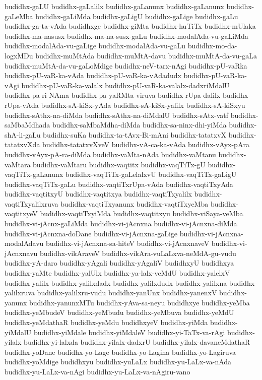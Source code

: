 {budidhx-gaLU
budidhx-gaLalilx
budidhx-gaLanunx
budidhx-gaLanunx
budidhx-gaLeMba
budidhx-gaLiMda
budidhx-gaLigU
budidhx-gaLige
budidhx-gaLu
budidhx-ga-ta-vAda
budidhxge
budidhx-giMta
budidhx-huTiTx
budidhx-mUlaka
budidhx-ma-nasusx
budidhx-ma-na-susx-gaLu
budidhx-modalAda-vu-gaLiMda
budidhx-modalAda-vu-gaLige
budidhx-modalAda-vu-gaLu
budidhx-mo-da-logxMDu
budidhx-muMtAda
budidhx-muMtA-davu
budidhx-muMtA-da-vu-gaLa
budidhx-muMtA-da-vu-gaLoMdige
budidhx-neV-tarx-nAgi
budidhx-pU-vaRka
budidhx-pU-vaR-ka-vAda
budidhx-pU-vaR-ka-vAdadudx
budidhx-pU-vaR-ka-vAgi
budidhx-pU-vaR-ka-valalx
budidhx-pU-vaR-ka-valalx-dadxriMdalU
budidhx-pa-ri-NAma
budidhx-pa-yaRMta-viruva
budidhx-rUpa-dalilx
budidhx-rUpa-vAda
budidhx-sA-kiSx-yAda
budidhx-sA-kiSx-yalilx
budidhx-sA-kiSxyu
budidhx-sAthx-na-diMda
budidhx-sAthx-na-diMdalU
budidhx-sAtx-vatf
budidhx-saMbaMdhada
budidhx-saMbaMdha-diMda
budidhx-sa-ninx-dhi-yiMda
budidhx-shA-li-gaLu
budidhx-suKa
budidhx-ta-tAvx-Bi-mAni
budidhx-tatatxvX
budidhx-tatatxvXda
budidhx-tatatxvXveV
budidhx-vA-ca-ka-vAda
budidhx-vAyx-pAra
budidhx-vAyx-pA-ra-diMda
budidhx-vaMta-nAda
budidhx-vaMtanu
budidhx-vaMtara
budidhx-vaMtaru
budidhx-vaqtitx
budidhx-vaqTiTx-gU
budidhx-vaqTiTx-gaLanunx
budidhx-vaqTiTx-gaLelalxvU
budidhx-vaqTiTx-gaLigU
budidhx-vaqTiTx-gaLu
budidhx-vaqtiTxrUpa-vAda
budidhx-vaqtiTxyAda
budidhx-vaqtitxyU
budidhx-vaqtitxya
budidhx-vaqtiTxyalilx
budidhx-vaqtiTxyalilxruva
budidhx-vaqtiTxyanunx
budidhx-vaqtiTxyeMba
budidhx-vaqtitxyeV
budidhx-vaqtiTxyiMda
budidhx-vaqtitxyu
budidhx-viSaya-veMba
budidhx-vi-jAcnx-gaLiMda
budidhx-vi-jAcnxna
budidhx-vi-jAcnxna-diMda
budidhx-vi-jAcnxna-doDane
budidhx-vi-jAcnxna-gaLige
budidhx-vi-jAcnxna-modalAdavu
budidhx-vi-jAcnxna-sa-hiteV
budidhx-vi-jAcnxnaveV
budidhx-vi-jAcnxnavu
budidhx-vikAraveV
budidhx-vikAra-vuLaLxva-neMdA-gu-vudu
budidhx-yA-daro
budidhx-yAgali
budidhx-yAgaliV
budidhxyU
budidhxya
budidhx-yaMte
budidhx-yalUlx
budidhx-ya-lalx-veMdU
budidhx-yalelxV
budidhx-yalilx
budidhx-yalilxdadx
budidhx-yalilxdudx
budidhx-yalilxna
budidhx-yalilxruva
budidhx-yalilxru-vudu
budidhx-yanUnx
budidhx-yanenxV
budidhx-yanunx
budidhx-yanunxMTu
budidhx-yAva-sa-neyu
budidhxye
budidhx-yeMba
budidhx-yeMbudeV
budidhx-yeMbudu
budidhx-yeMbuva
budidhx-yeMdU
budidhx-yeMdathaR
budidhx-yeMdu
budidhxyeV
budidhx-yiMda
budidhx-yiMdalU
budidhx-yiMdale
budidhx-yiMdaleV
budidhx-yi-TaTx-va-rAgi
budidhx-yilalx
budidhx-yi-lalxda
budidhx-yilalx-dadxrU
budidhx-yilalx-davaneMdathaR
budidhx-yoDane
budidhx-yo-Lage
budidhx-yo-Lagina
budidhx-yo-Lagiruva
budidhx-yoMdige
budidhxyu
budidhx-yuLaLx
budidhx-yu-LaLx-va-nAda
budidhx-yu-LaLx-va-nAgi
budidhx-yu-LaLx-va-nAgiru-vano
}
